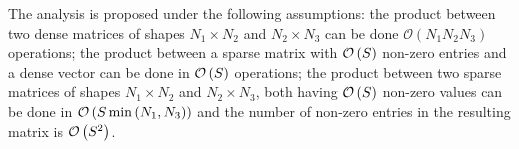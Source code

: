 The analysis is proposed under the following assumptions: the product between two dense matrices of shapes ${N_1\times N_2}$ and ${N_2\times N_3}$ can be done $\mathcal{O}\left (N_1 N_2 N_3 \right )$ operations; 
the product between a sparse matrix with $\mathcal{O}\left (S\right )$ non-zero entries and a dense vector can be done in $\mathcal{O}\left (S\right )$ operations; 
the product between two sparse matrices of shapes ${N_1\times N_2}$ and ${N_2\times N_3}$, both having $\mathcal{O}\left (S\right )$ non-zero values can be done in $\mathcal{O}\left (S \min\left (N_1, N_3\right )\right )$ and the number of non-zero entries in the resulting matrix is $\mathcal{O}\left (S^2\right )$.





%

